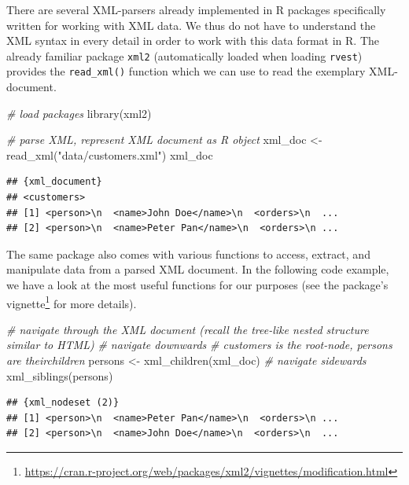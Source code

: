 \documentclass[
  12pt,
]{style/krantz}
\newenvironment{Shaded}{\begin{snugshade}}{\end{snugshade}}
\newcommand{\CommentTok}[1]{\textcolor[rgb]{0.56,0.35,0.01}{\textit{#1}}}
\newcommand{\FunctionTok}[1]{\textcolor[rgb]{0.00,0.00,0.00}{#1}}
\newcommand{\NormalTok}[1]{#1}
\newcommand{\OtherTok}[1]{\textcolor[rgb]{0.56,0.35,0.01}{#1}}
\newcommand{\StringTok}[1]{\textcolor[rgb]{0.31,0.60,0.02}{#1}}
\renewcommand{\href}[2]{#2\footnote{\url{#1}}}
\begin{document}
There are several XML-parsers already implemented in R packages specifically written for working with XML data. We thus do not have to understand the XML syntax in every detail in order to work with this data format in R. The already familiar package \texttt{xml2} (automatically loaded when loading \texttt{rvest}) provides the \texttt{read\_xml()} function which we can use to read the exemplary XML-document.

\begin{Shaded}
\begin{Highlighting}[]
\CommentTok{\# load packages}
\FunctionTok{library}\NormalTok{(xml2)}

\CommentTok{\# parse XML, represent XML document as R object}
\NormalTok{xml\_doc }\OtherTok{\textless{}{-}} \FunctionTok{read\_xml}\NormalTok{(}\StringTok{"data/customers.xml"}\NormalTok{)}
\NormalTok{xml\_doc}
\end{Highlighting}
\end{Shaded}

\begin{verbatim}
## {xml_document}
## <customers>
## [1] <person>\n  <name>John Doe</name>\n  <orders>\n  ...
## [2] <person>\n  <name>Peter Pan</name>\n  <orders>\n ...
\end{verbatim}

The same package also comes with various functions to access, extract, and manipulate data from a parsed XML document. In the following code example, we have a look at the most useful functions for our purposes (see the package's \href{https://cran.r-project.org/web/packages/xml2/vignettes/modification.html}{vignette} for more details).

\begin{Shaded}
\begin{Highlighting}[]
\CommentTok{\# navigate through the XML document (recall the tree{-}like nested structure similar to HTML)}
\CommentTok{\# navigate downwards}
\CommentTok{\# \textquotesingle{}customers\textquotesingle{} is the root{-}node, persons are their\textquotesingle{}children\textquotesingle{}}
\NormalTok{persons }\OtherTok{\textless{}{-}} \FunctionTok{xml\_children}\NormalTok{(xml\_doc) }
\CommentTok{\# navigate sidewards}
\FunctionTok{xml\_siblings}\NormalTok{(persons)}
\end{Highlighting}
\end{Shaded}

\begin{verbatim}
## {xml_nodeset (2)}
## [1] <person>\n  <name>Peter Pan</name>\n  <orders>\n ...
## [2] <person>\n  <name>John Doe</name>\n  <orders>\n  ...
\end{verbatim}
\end{document}

